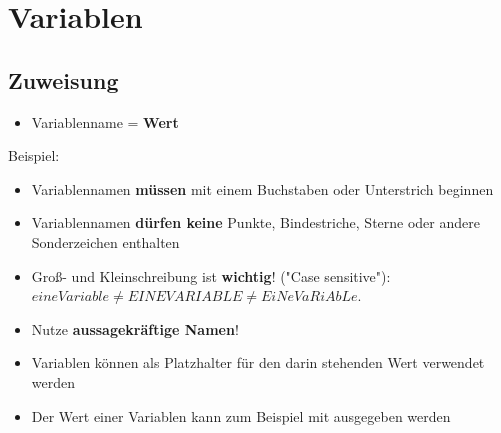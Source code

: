 \section{Variablen}
\subsection{Zuweisung}
\begin{frame}
	\slidehead
	\begin{itemize}
		\item Variablenname = \textbf{Wert}
	\end{itemize}
	\pause
	Beispiel:
\end{frame}

\begin{frame}
	\slidehead

	\begin{itemize}
		\item Variablennamen \textbf{müssen} mit einem Buchstaben oder Unterstrich beginnen
		\item Variablennamen \textbf{dürfen keine} Punkte, Bindestriche, Sterne oder andere Sonderzeichen enthalten
		\pause
		\item Groß- und Kleinschreibung ist \textbf{wichtig}! ("Case sensitive"):\\ $eineVariable \neq EINEVARIABLE \neq EiNeVaRiAbLe$.
		\pause
		\item Nutze \textbf{aussagekräftige Namen}!
		\pause
		\item Variablen können als Platzhalter für den darin stehenden Wert verwendet werden
		\item Der Wert einer Variablen kann zum Beispiel mit  ausgegeben werden
	\end{itemize}
\end{frame}

\livecoding




